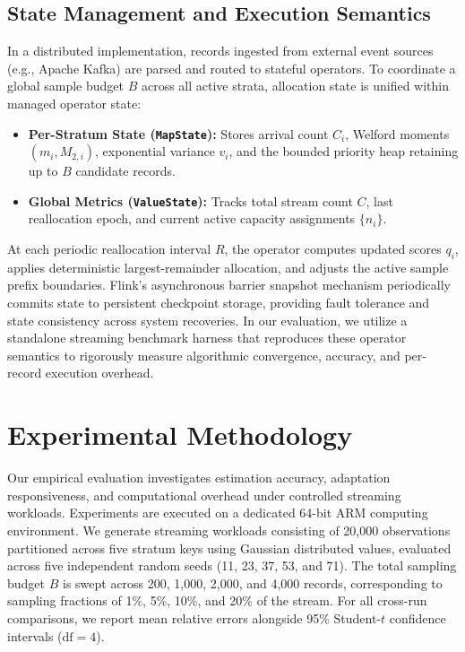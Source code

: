 \documentclass[conference]{IEEEtran}
\begin{document}
\subsection{State Management and Execution Semantics}

In a distributed implementation, records ingested from external event sources (e.g., Apache Kafka) are parsed and routed to stateful operators. To coordinate a global sample budget $B$ across all active strata, allocation state is unified within managed operator state:
\begin{itemize}
    \item \textbf{Per-Stratum State (\texttt{MapState}):} Stores arrival count $C_i$, Welford moments $(m_i, M_{2,i})$, exponential variance $v_i$, and the bounded priority heap retaining up to $B$ candidate records.
    \item \textbf{Global Metrics (\texttt{ValueState}):} Tracks total stream count $C$, last reallocation epoch, and current active capacity assignments $\{n_i\}$.
\end{itemize}

At each periodic reallocation interval $R$, the operator computes updated scores $q_i$, applies deterministic largest-remainder allocation, and adjusts the active sample prefix boundaries. Flink's asynchronous barrier snapshot mechanism periodically commits state to persistent checkpoint storage, providing fault tolerance and state consistency across system recoveries. In our evaluation, we utilize a standalone streaming benchmark harness that reproduces these operator semantics to rigorously measure algorithmic convergence, accuracy, and per-record execution overhead.


\section{Experimental Methodology}
\label{sec:methodology}

Our empirical evaluation investigates estimation accuracy, adaptation responsiveness, and computational overhead under controlled streaming workloads. Experiments are executed on a dedicated 64-bit ARM computing environment. We generate streaming workloads consisting of 20,000 observations partitioned across five stratum keys using Gaussian distributed values, evaluated across five independent random seeds (11, 23, 37, 53, and 71). The total sampling budget $B$ is swept across 200, 1,000, 2,000, and 4,000 records, corresponding to sampling fractions of 1\%, 5\%, 10\%, and 20\% of the stream. For all cross-run comparisons, we report mean relative errors alongside 95\% Student-$t$ confidence intervals ($\mathrm{df}=4$).
\end{document}
